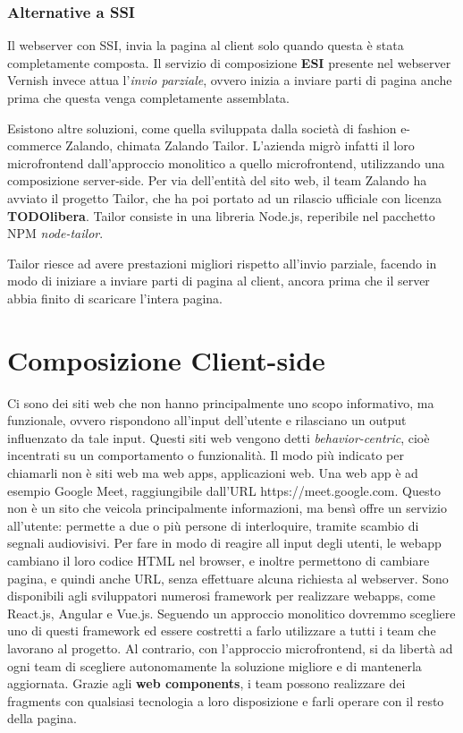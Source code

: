 \subsubsection{Alternative a SSI}
Il webserver con SSI, invia la pagina al client solo quando questa è stata completamente composta.
Il servizio di composizione \textbf{ESI} presente nel webserver Vernish invece attua l'\emph{invio parziale},
 ovvero inizia a inviare parti di pagina anche prima che questa venga completamente assemblata.

Esistono altre soluzioni, come quella sviluppata dalla società di fashion e-commerce Zalando, chimata Zalando Tailor.
L'azienda migrò infatti il loro microfrontend dall'approccio monolitico a quello microfrontend, utilizzando una composizione
server-side. Per via dell'entità del sito web, il team Zalando ha avviato il progetto Tailor, che ha poi portato ad un rilascio 
ufficiale con licenza \textbf{TODOlibera}. Tailor consiste in una libreria Node.js, reperibile nel pacchetto NPM \emph{node-tailor}.

Tailor riesce ad avere prestazioni migliori rispetto all'invio parziale, facendo in modo di iniziare a inviare parti di pagina al client,
ancora prima che il server abbia finito di scaricare l'intera pagina.

\pagebreak
\section{Composizione Client-side}
Ci sono dei siti web che non hanno principalmente uno scopo informativo, ma funzionale, ovvero rispondono all'input dell'utente
e rilasciano un output influenzato da tale input. Questi siti web vengono detti \emph{behavior-centric}, cioè 
incentrati su un comportamento o funzionalità.
Il modo più indicato per chiamarli non è siti web ma web apps, applicazioni web.
Una web app è ad esempio Google Meet, raggiungibile dall'URL https://meet.google.com.
Questo non è un sito che veicola principalmente informazioni, ma bensì offre un servizio all'utente: permette a due o più persone di 
interloquire, tramite scambio di segnali audiovisivi. Per fare in modo di reagire
all input degli utenti, le webapp cambiano il loro codice HTML nel browser, e inoltre permettono 
di cambiare pagina, e quindi anche URL, senza effettuare alcuna richiesta al webserver.
Sono disponibili agli sviluppatori numerosi framework per realizzare webapps, come React.js, Angular e Vue.js.
Seguendo un approccio monolitico dovremmo scegliere uno di questi framework ed essere costretti a farlo utilizzare
a tutti i team che lavorano al progetto. Al contrario, con l'approccio microfrontend, si da libertà ad ogni team
di scegliere autonomamente la soluzione migliore e di mantenerla aggiornata.
Grazie agli \textbf{web components}, i team possono realizzare dei fragments con qualsiasi tecnologia a loro disposizione e 
farli operare con il resto della pagina.



